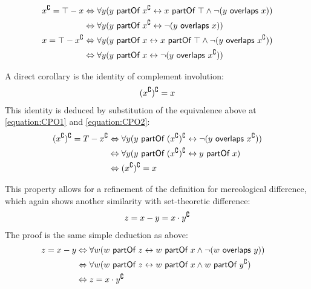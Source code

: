 \begin{align}
\begin{split}
x^{\complement} = \top - x
&\Leftrightarrow
\forall y(y ~\textsf{partOf}~ x^{\complement} \leftrightarrow x ~\textsf{partOf}~ \top \wedge \neg(y ~\textsf{overlaps}~ x))
\\&\Leftrightarrow
\forall y(y ~\textsf{partOf}~ x^{\complement} \leftrightarrow \neg(y ~\textsf{overlaps}~ x))
\end{split}
\label{equation:CPO1}
\\
\begin{split}
x = \top - x^{\complement} 
&\Leftrightarrow
\forall y(y ~\textsf{partOf}~ x \leftrightarrow x ~\textsf{partOf}~ \top \wedge \neg(y ~\textsf{overlaps}~ x^{\complement} ))
\\&\Leftrightarrow
\forall y(y ~\textsf{partOf}~ x \leftrightarrow \neg(y ~\textsf{overlaps}~ x^{\complement} ))
\end{split}
\label{equation:CPO2}
\end{align}

A direct corollary is the identity of complement involution:
\begin{align}
(x^{\complement})^{\complement} = x
\end{align}
This identity is deduced by substitution of the equivalence above at \ref{equation:CPO1} and \ref{equation:CPO2}:
\begin{align}
\begin{split}
(x^{\complement})^{\complement} = T - x^{\complement}
&\Leftrightarrow
\forall y (y ~\textsf{partOf}~ (x^{\complement})^{\complement} \leftrightarrow \neg(y ~\textsf{overlaps}~ x^{\complement}))
\\&\Leftrightarrow
\forall y (y ~\textsf{partOf}~ (x^{\complement})^{\complement} \leftrightarrow y ~\textsf{partOf}~ x)
\\&\Leftrightarrow
(x^{\complement})^{\complement} = x
\end{split}
\end{align}

This property allows for a refinement of the definition for mereological difference, which again shows another similarity with set-theoretic difference:
\begin{align}
z = x - y = x \cdot y^{\complement}
\end{align}
The proof is the same simple deduction as above:
\begin{align}
&\begin{split}
z = x - y
&\Leftrightarrow
\forall w (w ~\textsf{partOf}~ z \leftrightarrow w ~\textsf{partOf}~ x \wedge \neg (w ~\textsf{overlaps}~ y))
\\&\Leftrightarrow
\forall w (w ~\textsf{partOf}~ z \leftrightarrow w ~\textsf{partOf}~ x \wedge w ~\textsf{partOf}~ y^{\complement})
\\&\Leftrightarrow
z = x \cdot y^{\complement}
\end{split}
\end{align}

